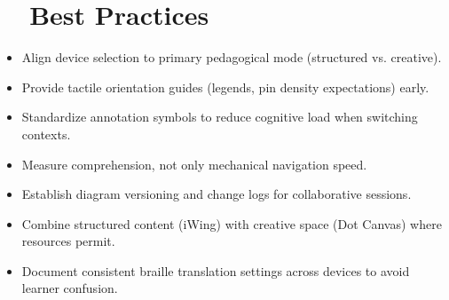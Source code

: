 \section{~~Best Practices}
\label{sec:sr29-best-practices}
\begin{itemize}
	\item Align device selection to primary pedagogical mode (structured vs. creative).
	\item Provide tactile orientation guides (legends, pin density expectations) early.
	\item Standardize annotation symbols to reduce cognitive load when switching contexts.
	\item Measure comprehension, not only mechanical navigation speed.
	\item Establish diagram versioning and change logs for collaborative sessions.
	\item Combine structured content (iWing) with creative space (Dot Canvas) where resources permit.
	\item Document consistent braille translation settings across devices to avoid learner confusion.
\end{itemize}

